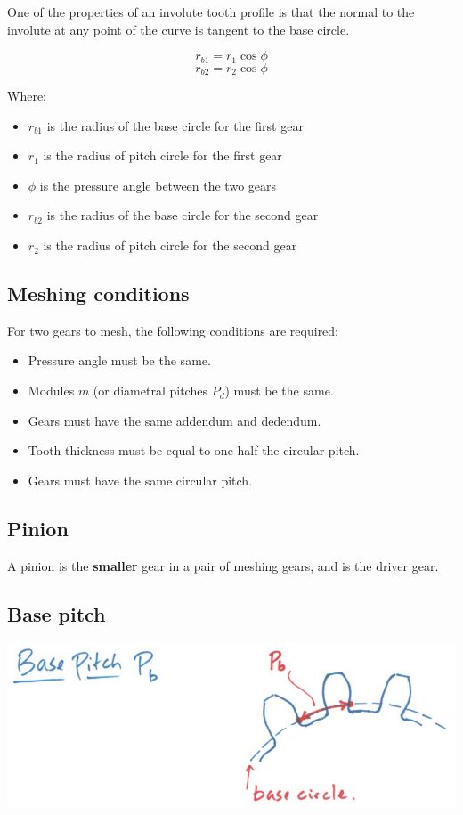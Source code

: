 \documentclass[11pt]{article}
\begin{document}
One of the properties of an involute tooth profile is that the normal to the involute at any point of the curve is tangent to the base circle.

\[r_{b1} = r_1 \cos \phi\]
\[r_{b2} = r_2 \cos \phi\]

Where:
\begin{itemize}
\item \(r_{b1}\) is the radius of the base circle for the first gear
\item \(r_1\) is the radius of pitch circle for the first gear
\item \(\phi\) is the pressure angle between the two gears
\item \(r_{b2}\) is the radius of the base circle for the second gear
\item \(r_2\) is the radius of pitch circle for the second gear
\end{itemize}
\subsection{Meshing conditions}
\label{sec:orgf31fe7f}
For two gears to mesh, the following conditions are required:
\begin{itemize}
\item Pressure angle must be the same.
\item Modules \(m\) (or diametral pitches \(P_d\)) must be the same.
\item Gears must have the same addendum and dedendum.
\item Tooth thickness must be equal to one-half the circular pitch.
\item Gears must have the same circular pitch.
\end{itemize}
\subsection{Pinion}
\label{sec:org97218a8}
A pinion is the \textbf{smaller} gear in a pair of meshing gears, and is the driver gear.
\subsection{Base pitch}
\label{sec:org0a06b03}
\begin{center}
\includegraphics[width=.9\linewidth]{./images/base-pitch-diagram.png}
\end{center}
\end{document}
